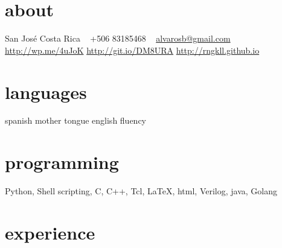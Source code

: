 \documentclass[]{friggeri-cv}
\begin{document}


\begin{aside}
  \section{about}
San José
Costa Rica
~
+506 83185468
~
\href{mailto:alvarosb@gmail.com}{alvarosb@gmail.com}
\href{http://wp.me/4uJoK}{http://wp.me/4uJoK}
\href{http://git.io/DM8URA}{http://git.io/DM8URA}
\href{http://rngkll.github.io}{http://rngkll.github.io}
\section{languages}
spanish mother tongue
english fluency
\section{programming}
Python,
Shell scripting, C,
C++, Tcl, \LaTeX, html,
Verilog, java, Golang
\end{aside}


\section{experience}
\end{document}
